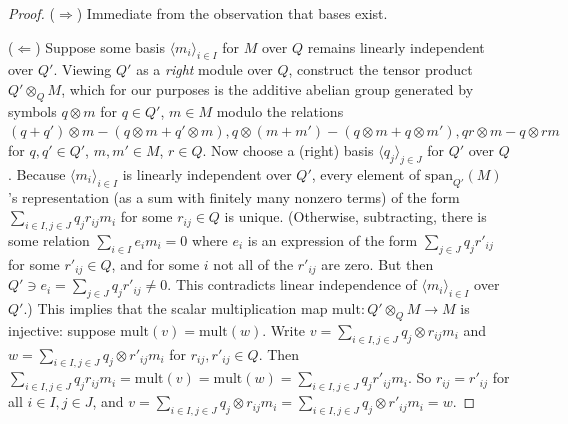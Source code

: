 \documentclass{amsart}
\theoremstyle{definition}
\theoremstyle{remark}
\numberwithin{equation}{section}
\begin{document}
\begin{proof}

($\Rightarrow$) Immediate from the observation that bases exist.

($\Leftarrow$) Suppose some basis $\langle m_{i}\rangle_{i \in I}$ for $M$ over $Q$ remains linearly independent over $Q'$. Viewing $Q'$ as a \textit{right} module over $Q$, construct the tensor product $Q' \otimes_{Q} M$, which for our purposes is the additive abelian group generated by symbols $q \otimes m$ for $q \in Q'$, $m \in M$ modulo the relations $(q + q') \otimes m - (q \otimes m + q' \otimes m), q\otimes (m+m') - (q \otimes m + q \otimes m'), qr \otimes m - q \otimes rm $ for $q, q' \in Q'$, $m, m' \in M$, $r \in Q$. Now choose a (right) basis $\langle q_{j}\rangle_{j \in J}$ for $Q'$ over $Q$. Because $\langle m_{i}\rangle_{i \in I}$ is linearly independent over $Q'$, every element of $\mathrm{span}_{Q'}(M)$'s representation (as a sum with finitely  many nonzero terms) of the form $\sum_{i \in I, j\in J}q_{j}r_{ij}m_{i}$ for some $r_{ij} \in Q$ is unique. (Otherwise, subtracting, there is some relation $\sum_{i \in I} e_{i} m_{i} =0 $ where $e_{i}$ is an expression of the form $\sum_{j \in J} q_{j}r'_{ij}$ for some $r'_{ij} \in Q$, and for some $i$ not all of the $r'_{ij}$ are zero. But then $Q' \ni e_{i} = \sum_{j \in J} q_{j}r'_{ij} \neq 0$. This contradicts linear independence of $\langle m_{i}\rangle_{i \in I}$ over $Q'$.) This implies that the scalar multiplication map $\mathrm{mult}: Q' \otimes_{Q} M \to M$ is injective: suppose $\mathrm{mult}(v) = \mathrm{mult}(w)$. Write $ v =\sum_{i \in I, j\in J}q_{j}\otimes r_{ij}m_{i}$ and $ w =\sum_{i \in I, j\in J}q_{j}\otimes r'_{ij}m_{i}$ for $r_{ij}, r'_{ij} \in Q$. Then $\sum_{i \in I, j\in J}q_{j}r_{ij}m_{i}=\mathrm{mult}(v) = \mathrm{mult}(w)=\sum_{i \in I, j\in J}q_{j}r'_{ij}m_{i}$. So $r_{ij}=r'_{ij}$ for all $i \in I, j \in J$, and $v =\sum_{i \in I, j\in J}q_{j}\otimes r_{ij}m_{i}= \sum_{i \in I, j\in J}q_{j}\otimes r'_{ij}m_{i} = w $.



\end{proof}
\end{document}
